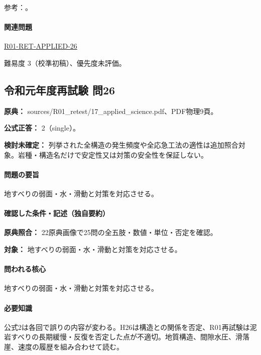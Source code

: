 \par 参考：\cite{eng52_slip_weaklayer,eng52_landslide_ref}。

\paragraph{関連問題} \hyperref[q:r01-ret-applied-26]{R01-RET-APPLIED-26}

\par 難易度 3（校準初稿）、優先度未評価。

\subsection{令和元年度再試験 問26}
\label{q:r01-ret-applied-26}

\noindent\textbf{原典：} sources/R01\_retest/17\_applied\_science.pdf、PDF物理9頁。

\textbf{公式正答：} 2（single）。

\par\textbf{検討未確定：} 列挙された全構造の発生頻度や全応急工法の適性は追加照合対象。岩種・構造名だけで安定性又は対策の安全性を保証しない。

\paragraph{問題の要旨} 地すべりの弱面・水・滑動と対策を対応させる。

\paragraph{確認した条件・記述（独自要約）}\mbox{}\par

\noindent\textbf{原典照合：} 22原典画像で25問の全五肢・数値・単位・否定を確認。\par

\noindent\textbf{対象：} 地すべりの弱面・水・滑動と対策を対応させる。\par

\paragraph{問われる核心} 地すべりの弱面・水・滑動と対策を対応させる。

\paragraph{必要知識} 公式2は各回で誤りの内容が変わる。H26は構造との関係を否定、R01再試験は泥岩すべりの長期緩慢・反復を否定した点が不適切。地質構造、間隙水圧、滑落崖、速度の履歴を組み合わせて読む。

